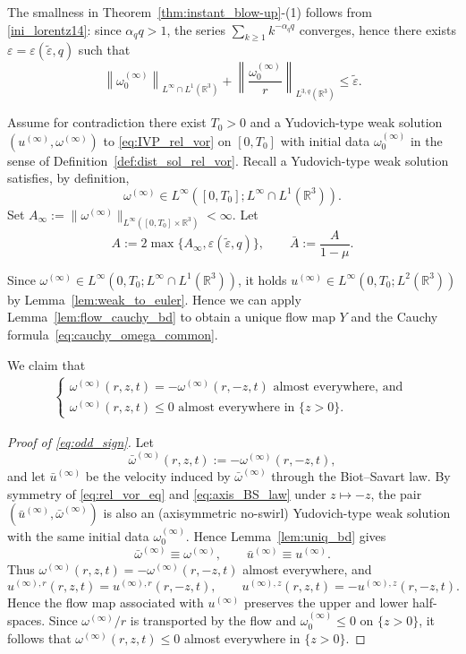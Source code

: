 \documentclass[reqno,11pt]{amsart}
\newcommand{\R}{\mathbb{R}}
\begin{document}
The smallness in Theorem~\ref{thm:instant_blow-up}-(1) follows from \eqref{ini_lorentz14}: since $\alpha_q q>1$, the series
$\sum_{k\ge1}k^{-\alpha_q q}$ converges, hence there exists $\varepsilon=\varepsilon(\tilde\varepsilon,q)$ such that
\[
\left\|\omega_0^{(\infty)}\right\|_{L^\infty\cap L^{1}(\R^3)}+\left\|\frac{\omega_0^{(\infty)}}{r}\right\|_{L^{3,q}(\R^3)}\le \tilde\varepsilon.
\]

Assume for contradiction there exist $T_0>0$ and a Yudovich-type weak solution $(u^{(\infty)},\omega^{(\infty)})$
to \eqref{eq:IVP_rel_vor} on $[0,T_0]$ with initial data $\omega_0^{(\infty)}$ in the sense of Definition~\ref{def:dist_sol_rel_vor}.
Recall a Yudovich-type weak solution satisfies, by definition,
\[
\omega^{(\infty)}\in L^\infty([0,T_0];L^\infty\cap L^1(\R^3)).
\]
Set $A_\infty:=\|\omega^{(\infty)}\|_{L^\infty([0,T_0]\times\R^3)}<\infty$. Let
\[
A:=2\max\{A_\infty,\varepsilon(\tilde\varepsilon,q)\},\qquad \bar A:=\frac{A}{1-\mu}.
\]



Since $\omega^{(\infty)} \in L^\infty(0,T_0; L^\infty\cap L^1(\mathbb{R}^3))$, it holds $u^{(\infty)}\in L^\infty (0,T_0; L^2(\mathbb{R}^3))$ by Lemma~\ref{lem:weak_to_euler}. Hence we can apply Lemma~\ref{lem:flow_cauchy_bd} to obtain a unique flow map $Y$ and the Cauchy formula~\eqref{eq:cauchy_omega_common}.









We claim that 
\begin{align}
\label{eq:odd_sign}
    \begin{cases}
        \text{$\omega^{(\infty)}(r,z,t)=-\omega^{(\infty)}(r,-z,t)$ almost everywhere,  and }
        \\
        \text{$\omega^{(\infty)}(r,z,t)\leq 0$ almost everywhere in $\{z>0\}$. }
    \end{cases}
\end{align}
\begin{proof}[Proof of \eqref{eq:odd_sign}]
Let
\[
\bar \omega^{(\infty)}(r,z,t):=-\omega^{(\infty)}(r,-z,t),
\]
and let $\bar u^{(\infty)}$ be the velocity induced by $\bar \omega^{(\infty)}$ through the
Biot--Savart law. By symmetry of \eqref{eq:rel_vor_eq} and \eqref{eq:axis_BS_law} under
$z\mapsto -z$, the pair $(\bar u^{(\infty)},\bar \omega^{(\infty)})$ is also an
(axisymmetric no-swirl) Yudovich-type weak solution with the same initial data
$\omega_0^{(\infty)}$. Hence Lemma~\ref{lem:uniq_bd} gives
\[
\bar \omega^{(\infty)}\equiv \omega^{(\infty)},
\qquad
\bar u^{(\infty)}\equiv u^{(\infty)}.
\]
Thus $\omega^{(\infty)}(r,z,t)=-\omega^{(\infty)}(r,-z,t)$ almost everywhere, and
\[
u^{(\infty),r}(r,z,t)=u^{(\infty),r}(r,-z,t),\qquad
u^{(\infty),z}(r,z,t)=-u^{(\infty),z}(r,-z,t).
\]
Hence the flow map associated with $u^{(\infty)}$ preserves the upper and lower half-spaces.
Since $\omega^{(\infty)}/r$ is transported by the flow and
$\omega_0^{(\infty)}\le 0$ on $\{z>0\}$, it follows that
$\omega^{(\infty)}(r,z,t)\le 0$ almost everywhere in $\{z>0\}$.
\end{proof}
\end{document}
